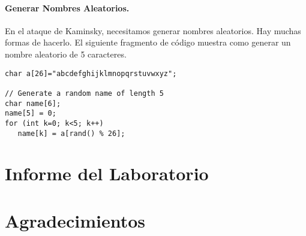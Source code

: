 \paragraph{Generar Nombres Aleatorios.} En el ataque de Kaminsky, necesitamos generar nombres aleatorios. Hay muchas formas de hacerlo. El siguiente fragmento de código muestra como generar un nombre aleatorio de 5 caracteres.
\begin{lstlisting}
char a[26]="abcdefghijklmnopqrstuvwxyz";

// Generate a random name of length 5
char name[6];
name[5] = 0;
for (int k=0; k<5; k++)  
   name[k] = a[rand() % 26];
\end{lstlisting}
 



\section{Informe del Laboratorio}




\section*{Agradecimientos}




\thispagestyle{empty}

\def\baselinestretch{1}









